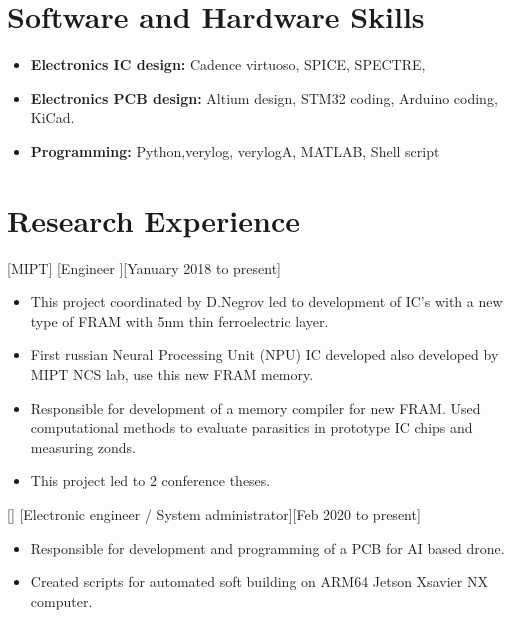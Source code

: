 \documentclass{article}
\begin{document}
\section{Software and Hardware Skills}
\begin{itemize}
\item \textbf{Electronics IC design:} Cadence virtuoso, SPICE, SPECTRE,
\item \textbf{Electronics PCB design:} Altium design, STM32 coding, Arduino coding, KiCad.
\item \textbf{Programming:} Python,verylog, verylogA, MATLAB, Shell script
\end{itemize}

\section{Research Experience}

[MIPT]
[Engineer ][Yanuary 2018 to present]

\begin{itemize}
\item This project coordinated by D.Negrov led to development of IC's with a new type of FRAM with 5nm thin ferroelectric layer.
\item First russian Neural Processing Unit (NPU) IC developed also developed by MIPT NCS lab, use this new FRAM memory.
\item Responsible for development of a memory compiler for new FRAM. Used computational methods to evaluate parasitics in prototype IC chips and measuring zonds.
\item This project led to 2 conference theses.
\end{itemize}


[]
[Electronic engineer / System administrator][Feb 2020 to present]

\begin{itemize}
\item Responsible for development and programming of a PCB for AI based drone.
\item Created scripts for automated soft building on ARM64 Jetson Xsavier NX computer.
\end{itemize}
\end{document}

